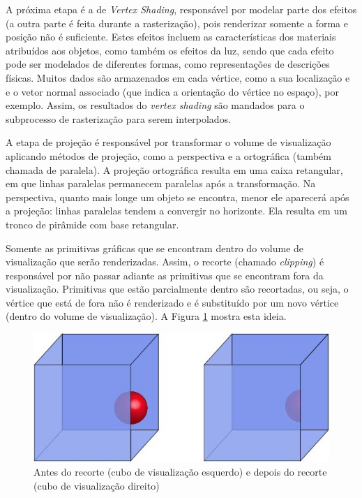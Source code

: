 	A próxima etapa é a de \textit{Vertex Shading}, responsável por modelar parte dos efeitos (a outra parte é feita durante a rasterização), pois renderizar somente a forma e posição não é suficiente.  Estes efeitos incluem as características dos materiais atribuídos aos objetos, como também os efeitos da luz, sendo que cada efeito pode ser modelados de diferentes formas, como representações de descrições físicas. Muitos dados são armazenados em cada vértice, como a sua localização e e o vetor normal associado (que indica a orientação do vértice no espaço), por exemplo. Assim, os resultados do \textit{vertex shading} são mandados para o subprocesso de rasterização para serem interpolados. 

	A etapa de projeção é responsável por transformar o volume de visualização aplicando métodos de projeção, como a perspectiva e a ortográfica (também chamada de paralela). A projeção ortográfica resulta em uma caixa retangular, em que linhas paralelas permanecem paralelas após a transformação. Na perspectiva, quanto mais longe um objeto se encontra, menor ele aparecerá após a projeção: linhas paralelas tendem a convergir no horizonte. Ela resulta em um tronco de pirâmide com base retangular. 

	Somente as primitivas gráficas que se encontram dentro do volume de visualização que serão renderizadas. Assim, o recorte (chamado \textit{clipping}) é responsável por não passar adiante as primitivas que se encontram fora da visualização. Primitivas que estão parcialmente dentro são recortadas, ou seja, o vértice que está de fora não é renderizado e é substituído por um novo vértice (dentro do volume de visualização). A  Figura \ref{clip} mostra esta ideia.

       \begin{figure}[h]
       \centering
	\includegraphics[keepaspectratio=true,scale=0.8]{figuras/clip.jpg}
       \caption{Antes do recorte (cubo de visualização esquerdo) e depois do recorte (cubo de visualização direito)}
       \label{clip}
       \end{figure}


